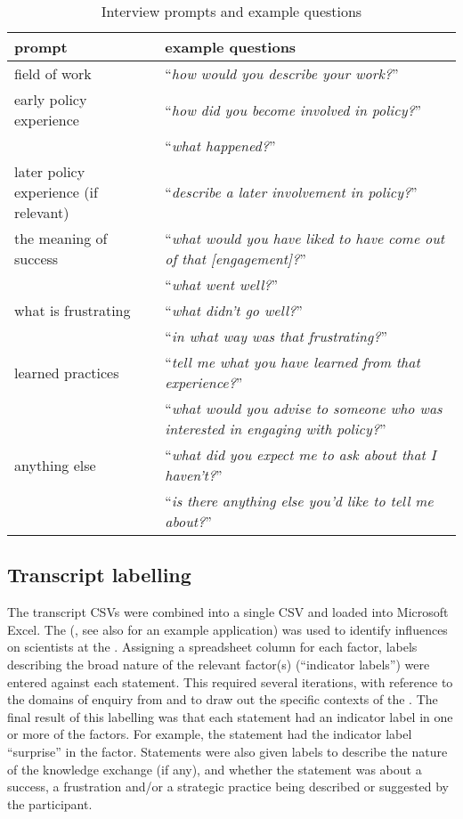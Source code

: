 \begin{table}
    \footnotesize
    \caption{Interview prompts and example questions}\label{tab:metinterview}
    \begin{tabular}{L{.4\linewidth}L{.6\linewidth}} 
    \textbf{prompt} & \textbf{example questions} \\ \hline
    field of work & ``\textit{how would you describe your work?}'' \rule[-2ex]{0pt}{6ex}\\
    early policy experience & ``\textit{how did you become involved in policy?}'' \\
     & ``\textit{what happened?}'' \\\rule{0pt}{4ex}
    later policy experience (if relevant) & ``\textit{describe a later involvement in policy?}'' \\\rule{0pt}{4ex}
    the meaning of success & ``\textit{what would you have liked to have come out of that [engagement]?}''\\
     & ``\textit{what went well?}'' \\\rule{0pt}{4ex}
    what is frustrating & ``\textit{what didn't go well?}'' \\
     & ``\textit{in what way was that frustrating?}''\\\rule{0pt}{4ex}
    learned practices  & ``\textit{tell me what you have learned from that experience?}'' \\
     & ``\textit{what would you advise to someone who was interested in engaging with policy?}''\\\rule{0pt}{4ex}
    anything else & ``\textit{what did you expect me to ask about that I haven't?}'' \\
     & ``\textit{is there anything else you'd like to tell me about?}'' \\[2ex] \hline
    \end{tabular}
\end{table}

\subsection{Transcript labelling}\label{sec:metlabelling}

The transcript CSVs were combined into a single CSV and loaded into Microsoft Excel. The \ISM{} (\cite{DarntonH2013}, see also \cite{MinamitaniDOI2024} for an example application) was used to identify influences on scientists at the \SPI. Assigning a spreadsheet column for each \ISM{} factor, labels describing the broad nature of the relevant factor(s) (``indicator labels'') were entered against each statement. This required several iterations, with reference to the domains of enquiry from \textcite{BuseMW2012} and \textcite{HaynesDCRHGS2011} to draw out the specific contexts of the \SPI. The final result of this labelling was that each statement had an indicator label in one or more of the \ISM{} factors. For example, the statement  had the indicator label ``surprise'' in the \ismie{} factor. Statements were also given labels to describe the nature of the knowledge exchange (if any), and whether the statement was about a success, a frustration and/or a strategic practice being described or suggested by the participant.


